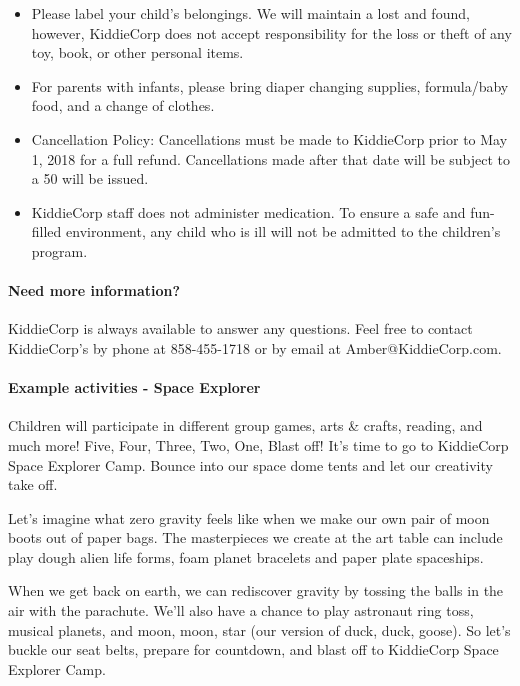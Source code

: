 \begin{itemize}
\item Please label your child's belongings. We will maintain a lost and found,
however, KiddieCorp does not accept responsibility for the loss or theft of
any toy, book, or other personal items.
\item For parents with infants, please bring diaper changing supplies,
formula/baby food, and a change of clothes.
\item Cancellation Policy: Cancellations must be made to KiddieCorp prior to
May 1, 2018 for a full refund. Cancellations made after that date will be
subject to a 50%
will be issued.
\item KiddieCorp staff does not administer medication. To ensure a safe and
fun-filled environment, any child who is ill will not be admitted to the
children's program.
\end{itemize}


\paragraph{Need more information?} KiddieCorp is always available to answer any questions. Feel free to
contact KiddieCorp's by phone at 858-455-1718 or by email at
Amber@KiddieCorp.com. 


\paragraph{Example activities - Space Explorer}

Children will participate in different group games, arts & crafts, reading,
and much more! 
Five, Four, Three, Two, One, Blast off!  It’s time to go to KiddieCorp
Space Explorer Camp.  
Bounce into our space dome tents and let our creativity take off.



Let’s imagine what zero gravity feels like when we make our own
pair of moon boots out of paper bags.  The masterpieces we create 
at the art table can include play dough alien life forms, foam planet 
bracelets and paper plate spaceships.

When we get back on earth, we can rediscover gravity by tossing
the balls in the air with the parachute. We’ll also have a chance to 
play astronaut ring toss, musical planets, and moon, moon, star 
(our version of duck, duck, goose).  So let’s buckle our seat belts, 
prepare for countdown, and blast off to KiddieCorp Space Explorer Camp.
